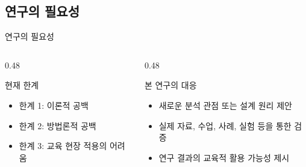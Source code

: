 \subsection{연구의 필요성}
\begin{frame}[t]{연구의 필요성}
\small

\begin{columns}[T]

\begin{column}{0.48\textwidth}
\begin{block}{현재 한계}
\begin{itemize}
\tightitems

\item 한계 1: 이론적 공백
\item 한계 2: 방법론적 공백
\item 한계 3: 교육 현장 적용의 어려움
\end{itemize}
\end{block}
\end{column}

\begin{column}{0.48\textwidth}
\begin{alertblock}{본 연구의 대응}
\begin{itemize}
\tightitems

\item 새로운 분석 관점 또는 설계 원리 제안
\item 실제 자료, 수업, 사례, 실험 등을 통한 검증
\item 연구 결과의 교육적 활용 가능성 제시
\end{itemize}
\end{alertblock}
\end{column}
\end{columns}

\vspace{0.25cm}


\end{frame}

